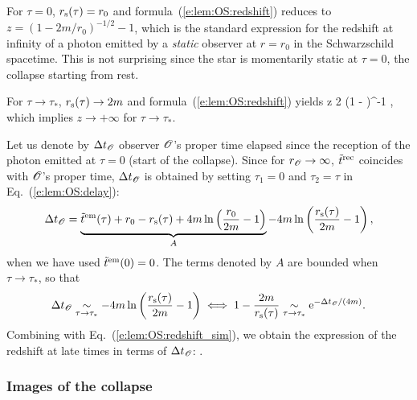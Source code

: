 For $\tau = 0$, $r_{\rm s}(\tau) = r_0$ and formula~(\ref{e:lem:OS:redshift}) reduces to
$z = (1 - 2m/r_0)^{-1/2} - 1$, which is the standard expression for the redshift at infinity of
a photon emitted by a \emph{static} observer at $r=r_0$ in the Schwarzschild spacetime. This is
not surprising since the star is momentarily static at $\tau=0$, the collapse starting
from rest.

For $\tau\to \tau_*$, $r_{\rm s}(\tau) \to 2 m$ and formula~(\ref{e:lem:OS:redshift}) yields
\be \label{e:lem:OS:redshift_sim}
    z \underset{\tau\to\tau_*}{\sim}  2 
     \left(1 -  \right)^{-1} ,
\ee
which implies $z \to +\infty$ for $\tau \to \tau_*$.

Let us denote by $\Delta t_{\mathscr{O}}$ observer $\mathscr{O}$'s proper time elapsed
since the reception of the photon emitted
at $\tau = 0$ (start of the collapse).
Since for $r_{\mathscr{O}} \to \infty$, ${\tilde t}^{\rm rec}$ coincides with $\mathscr{O}$'s proper time,
$\Delta t_{\mathscr{O}}$ is obtained by setting  $\tau_1 = 0$
and $\tau_2 = \tau$ in Eq.~(\ref{e:lem:OS:delay}):
\[
    \Delta t_{\mathscr{O}} = \underbrace{{\tilde t}^{\rm em}(\tau) + r_0 - r_{\rm s}(\tau)
    + 4 m \ln \left( \frac{r_0}{2m} - 1 \right)}_{A}
    -  4 m \ln \left( \frac{r_{\rm s}(\tau)}{2 m}  - 1 \right) ,
\]
when we have used ${\tilde t}^{\rm em}(0) = 0$.
The terms denoted by $A$ are bounded when $\tau\to \tau_*$, so that
\[
    \Delta t_{\mathscr{O}}  \underset{\tau\to\tau_*}{\sim} -  4 m \ln \left( \frac{r_{\rm s}(\tau)}{2 m}  - 1 \right)
    \iff 1 - \frac{2m}{r_{\rm s}(\tau)} \underset{\tau\to\tau_*}{\sim} \mathrm{e}^{-\Delta t_{\mathscr{O}}/(4 m)} .
\]
Combining with Eq.~(\ref{e:lem:OS:redshift_sim}), we obtain the expression
of the redshift at late times in terms of $\Delta t_{\mathscr{O}}$:
\be
    .
\ee


\subsubsection{Images of the collapse}


